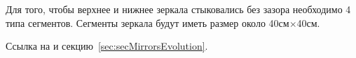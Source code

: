 



Для того, чтобы верхнее и нижнее зеркала стыковались без зазора необходимо 4 типа сегментов. Сегменты зеркала будут иметь размер около 40см$\times$40см.

Ссылка на  и секцию~\ref{sec:secMirrorsEvolution}.


